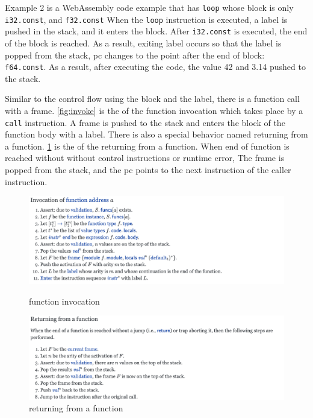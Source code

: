 Example 2 is a WebAssembly code example that has \texttt{loop} whose block is
only \texttt{i32.const}, and \texttt{f32.const}
When the \texttt{loop} instruction is executed, a label is pushed in the stack,
and it enters the block.
After \texttt{i32.const} is executed, the end of the block is reached.
As a result, exiting label occurs so that the label is popped from the stack,
pc changes to the point after the end of block: \texttt{f64.const}.
As a result, after executing the code, the value 42 and 3.14 pushed to the
stack.


Similar to the control flow using the block and the label, there is a function
call with a frame.
\cref{fig:invoke} is the \officialp{} of the function invocation which takes
place by a \texttt{call} instruction.
A frame is pushed to the stack and enters the block of the function body with a
label.
There is also a special behavior named returning from a function.
\cref{fig:returning} is the \officialp{} of the returning from a function.
When end of function is reached without without control instructions or runtime
error, The frame is popped from the stack, and the pc points to the next
instruction of the caller instruction.

\begin{figure}[h!]
    \centerline{\includegraphics[width=15cm]{fig/invoke}}
    \caption[Enter the caption title here]{function invocation} \label{fig:invoke}
    \centerline{\includegraphics[width=15cm]{fig/returning}}
    \caption[Enter the caption title here]{returning from a function} \label{fig:returning}
\end{figure}

